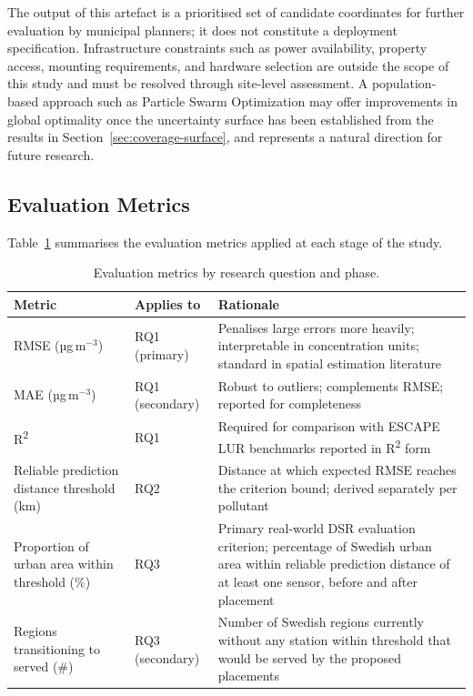 \documentclass[11pt,a4paper]{article}
\let\oldsubsection\subsection
\renewcommand{\subsection}{\FloatBarrier\oldsubsection}
\begin{document}
The output of this artefact is a prioritised set of candidate coordinates for further evaluation by municipal planners; it does not constitute a deployment specification. Infrastructure constraints such as power availability, property access, mounting requirements, and hardware selection are outside the scope of this study and must be resolved through site-level assessment. A population-based approach such as Particle Swarm Optimization \cite{gupta_pso_placement_2023} may offer improvements in global optimality once the uncertainty surface has been established from the results in Section~\ref{sec:coverage-surface}, and represents a natural direction for future research.

\subsection{Evaluation Metrics}
\label{sec:eval-metrics}

Table~\ref{tab:eval-metrics} summarises the evaluation metrics applied at each stage of the study.

\begin{table}[H]
\centering
\caption{Evaluation metrics by research question and phase.}
\label{tab:eval-metrics}
\begin{tabular}{p{} p{} p{}}
\toprule
\textbf{Metric} & \textbf{Applies to} & \textbf{Rationale} \\
\midrule
RMSE (µg\,m$^{-3}$) & RQ1 (primary) & Penalises large errors more heavily; interpretable in concentration units; standard in spatial estimation literature \\
MAE (µg\,m$^{-3}$) & RQ1 (secondary) & Robust to outliers; complements RMSE; reported for completeness \\
R\textsuperscript{2} & RQ1 & Required for comparison with ESCAPE LUR benchmarks reported in R\textsuperscript{2} form \cite{eeftens_escape_pm_2012, wang_escape_no2_2013} \\
Reliable prediction distance threshold (km) & RQ2 & Distance at which expected RMSE reaches the criterion bound; derived separately per pollutant \\
Proportion of urban area within threshold (\%) & RQ3 & Primary real-world DSR evaluation criterion; percentage of Swedish urban area within reliable prediction distance of at least one sensor, before and after placement \\
Regions transitioning to served (\#) & RQ3 (secondary) & Number of Swedish regions currently without any station within threshold that would be served by the proposed placements \\
\bottomrule
\end{tabular}
\end{table}
\end{document}
